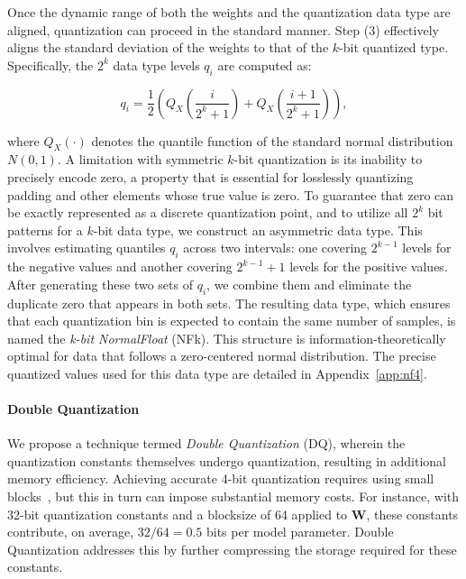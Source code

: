 Once the dynamic range of both the weights and the quantization data type are aligned, quantization can proceed in the standard manner. Step (3) effectively aligns the standard deviation of the weights to that of the $k$-bit quantized type. Specifically, the $2^k$ data type levels $q_i$ are computed as:

\begin{equation}
q_i  = \frac{1}{2}\left( Q_X\left(\frac{i}{2^k+1}\right) + Q_X\left(\frac{i+1}{2^k+1}\right)\right),
\end{equation}

where $Q_X(\cdot)$ denotes the quantile function of the standard normal distribution $N(0,1)$. A limitation with symmetric $k$-bit quantization is its inability to precisely encode zero, a property that is essential for losslessly quantizing padding and other elements whose true value is zero. To guarantee that zero can be exactly represented as a discrete quantization point, and to utilize all $2^k$ bit patterns for a $k$-bit data type, we construct an asymmetric data type. This involves estimating quantiles $q_i$ across two intervals: one covering $2^{k-1}$ levels for the negative values and another covering $2^{k-1} + 1$ levels for the positive values. After generating these two sets of $q_i$, we combine them and eliminate the duplicate zero that appears in both sets. The resulting data type, which ensures that each quantization bin is expected to contain the same number of samples, is named the \emph{k-bit NormalFloat} (NFk). This structure is information-theoretically optimal for data that follows a zero-centered normal distribution. The precise quantized values used for this data type are detailed in Appendix~\ref{app:nf4}.

\paragraph{Double Quantization{}} 
We propose a technique termed \emph{Double Quantization} (DQ), wherein the quantization constants themselves undergo quantization, resulting in additional memory efficiency. Achieving accurate 4-bit quantization requires using small blocks~\citep{dettmers2022case}, but this in turn can impose substantial memory costs. For instance, with 32-bit quantization constants and a blocksize of 64 applied to $\mathbf{W}$, these constants contribute, on average, $32/64 = 0.5$ bits per model parameter. Double Quantization addresses this by further compressing the storage required for these constants.

